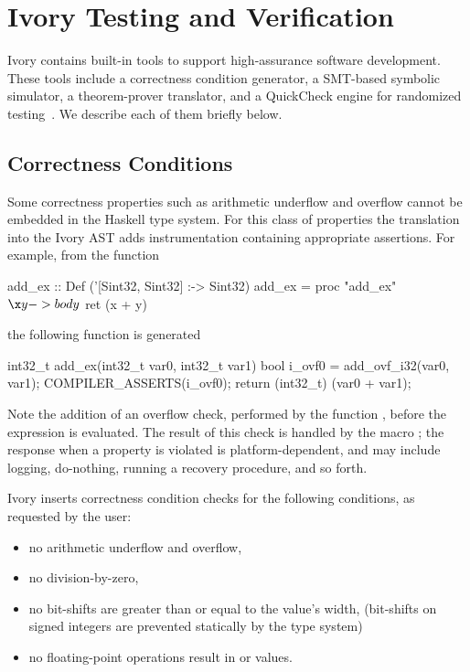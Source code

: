 \section{Ivory Testing and Verification}
\label{sec:tools}

Ivory contains built-in tools to support high-assurance software
development. These tools include a correctness condition generator, a
SMT-based symbolic simulator, a theorem-prover translator, and a
QuickCheck engine for randomized testing~\cite{qc}. We describe each of
them briefly below.


\subsection{Correctness Conditions}
Some correctness properties such as arithmetic underflow and overflow
cannot be embedded in the Haskell type system. For this class of
properties the translation into the Ivory AST adds instrumentation
containing appropriate assertions. For example, from the function

\begin{code}
add_ex :: Def ('[Sint32, Sint32] :-> Sint32)
add_ex = proc "add_ex" $ \x y -> body $
  ret (x + y)
\end{code}
\noindent
the following function is generated
\begin{code}
int32_t add_ex(int32_t var0, int32_t var1)
{
    bool i_ovf0 = add_ovf_i32(var0, var1);
    COMPILER_ASSERTS(i_ovf0);
    return (int32_t) (var0 + var1);
}
\end{code}
\noindent
Note the addition of an overflow check, performed by the function
, before the expression is evaluated. The result of
this check is handled by the macro
; the response when a property is
violated is platform-dependent, and may include logging, do-nothing, running a
recovery procedure, and so forth.

Ivory inserts correctness condition checks for the following conditions, as requested by
the user:
\begin{itemize}
\item no arithmetic underflow and overflow,
\item no division-by-zero,
\item no bit-shifts are greater than or equal to the value's width,
  (bit-shifts on signed integers are prevented statically by the type system)
\item no floating-point operations result in  or  values.
\end{itemize}

